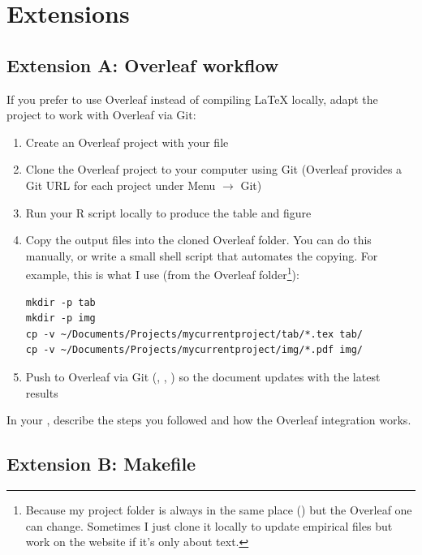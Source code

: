 \newpage

\section{Extensions}

\subsection{Extension A: Overleaf workflow}

If you prefer to use Overleaf instead of compiling \LaTeX{} locally, adapt the project to work with Overleaf via Git:

\begin{enumerate}[label=\arabic*.]
  \item Create an Overleaf project with your  file
  \item Clone the Overleaf project to your computer using Git (Overleaf provides a Git URL for each project under Menu $\rightarrow$ Git)
  \item Run your R script locally to produce the  table and  figure
  \item Copy the output files into the cloned Overleaf folder. You can do this manually, or write a small  shell script that automates the copying. For example, this is what I use (from the Overleaf folder\footnote{Because my project folder is always in the same place () but the Overleaf one can change. Sometimes I just clone it locally to update empirical files but work on the website if it's only about text.}):
  \begin{lstlisting}
mkdir -p tab
mkdir -p img
cp -v ~/Documents/Projects/mycurrentproject/tab/*.tex tab/
cp -v ~/Documents/Projects/mycurrentproject/img/*.pdf img/
  \end{lstlisting}
  \item Push to Overleaf via Git (, , ) so the document updates with the latest results
\end{enumerate}

In your , describe the steps you followed and how the Overleaf integration works.

\subsection{Extension B: Makefile}

